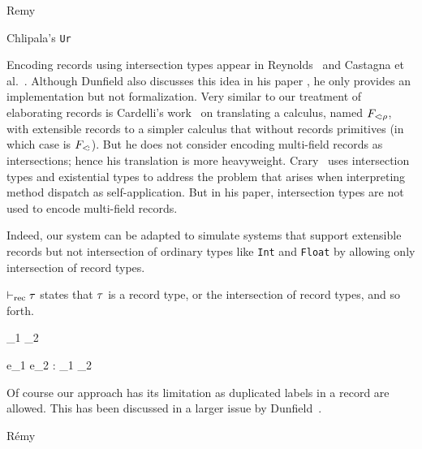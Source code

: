 Remy~\cite{remy1993type}

Chlipala's \texttt{Ur}~\cite{chlipala2010ur}

\cite{harper1991record}

Encoding records using intersection types appear in
Reynolds~\cite{reynolds1997design} and Castagna et
al.~\cite{castagna1995calculus}. Although Dunfield also discusses this idea in
his paper \cite{dunfield2014elaborating}, he only provides an implementation but
not formalization. Very similar to our treatment of elaborating records is
Cardelli's work~\cite{cardelli1992extensible} on translating a calculus, named
$ F_{<\!: \rho}$, with extensible records to a simpler calculus that without
records primitives (in which case is $ F_{<\!:} $). But he does not consider
encoding multi-field records as intersections; hence his translation is more
heavyweight. Crary~\cite{crary1998simple} uses intersection types and
existential types to address the problem that arises when interpreting method
dispatch as self-application. But in his paper, intersection types are not used
to encode multi-field records.

Indeed, our system can be adapted to simulate systems that support extensible
records but not intersection of ordinary types like \texttt{Int} and
\texttt{Float} by allowing only intersection of record types.

$ \vdash_{\textrm{rec}} \tau $ states that $ \tau $ is a record type, or the intersection of
record types, and so forth.


{\turnsrec \ty_1 \intersects \ty_2}

{\Gamma \turns e_1 \dcomma e_2 : \ty_1 \intersects \ty_2 }

Of course our approach has its limitation as duplicated labels in a record are
allowed. This has been discussed in a larger issue by
Dunfield~\cite{dunfield2014elaborating}.

R{\'e}my~\cite{remy1989type}
